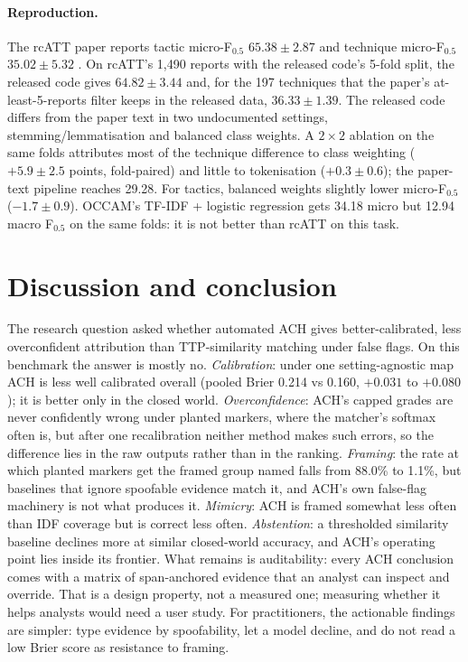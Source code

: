\documentclass[11pt]{article}
\begin{document}
\paragraph{Reproduction.} The rcATT paper reports tactic micro-F$_{0.5}$
$65.38\pm2.87$ and technique micro-F$_{0.5}$ $35.02\pm5.32$
\citep[Table~4, ``Inde.'' rows; the same means are in Tables~2 and 3]{legoy2020}.
On rcATT's 1,490 reports with the released code's 5-fold split, the released
code gives $64.82\pm3.44$ and, for the 197 techniques that the paper's
at-least-5-reports filter keeps in the released data, $36.33\pm1.39$. The
released code differs from the paper text in two undocumented settings,
stemming/lemmatisation and balanced class weights. A $2\times2$ ablation on
the same folds attributes most of the technique difference to class
weighting ($+5.9\pm2.5$ points, fold-paired) and little to tokenisation
($+0.3\pm0.6$); the paper-text pipeline reaches 29.28. For tactics, balanced
weights slightly lower micro-F$_{0.5}$ ($-1.7\pm0.9$). OCCAM's TF-IDF +
logistic regression gets 34.18 micro but 12.94 macro F$_{0.5}$ on the same
folds: it is not better than rcATT on this task.

\section{Discussion and conclusion}
The research question asked whether automated ACH gives better-calibrated,
less overconfident attribution than TTP-similarity matching under false
flags. On this benchmark the answer is mostly no.
\emph{Calibration}: under one setting-agnostic map ACH is less well calibrated
overall (pooled Brier 0.214 vs 0.160, $+0.031$ to $+0.080$); it is better
only in the closed world.
\emph{Overconfidence}: ACH's capped grades are never confidently wrong under
planted markers, where the matcher's softmax often is, but after one
recalibration neither method makes such errors, so the difference lies in the
raw outputs rather than in the ranking.
\emph{Framing}: the rate at which planted markers get the framed group named
falls from 88.0\% to 1.1\%, but baselines that ignore spoofable evidence match
it, and ACH's own false-flag machinery is not what produces it.
\emph{Mimicry}: ACH is framed somewhat less often than IDF coverage but is
correct less often.
\emph{Abstention}: a thresholded similarity baseline declines more at similar
closed-world accuracy, and ACH's operating point lies inside its frontier.
What remains is auditability: every ACH conclusion comes with a matrix of
span-anchored evidence that an analyst can inspect and override. That is a
design property, not a measured one; measuring whether it helps analysts
would need a user study. For practitioners, the actionable findings are
simpler: type evidence by spoofability, let a model decline, and do not read a
low Brier score as resistance to framing.
\end{document}
